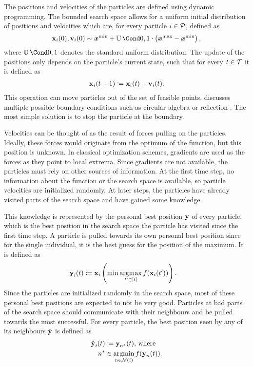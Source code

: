 The positions and velocities of the particles are defined using dynamic programming.
The bounded search space allows for a uniform initial distribution of positions and velocities which are, for every particle $i \in \operatorname{\mathcal{P}}$, defined as
\begin{align}
    \Pos_i(0), \Vel_i(0) \sim \mat{x^{\text{min}}} + \Uniform{0, 1} \cdot \left( \mat{x^{\text{max}}} - \mat{x^{\text{min}}} \right),
\end{align}
where $\Uniform{0, 1}$ denotes the standard uniform distribution.
The update of the positions only depends on the particle's current state, such that for every $t \in \mathcal{T}$ it is defined as
\begin{align}
    \operatorname{\mathbf{x}}_i(t+1) \coloneqq \operatorname{\mathbf{x}}_i(t) + \operatorname{\mathbf{v}}_i(t).
\end{align}
This operation can move particles out of the set of feasible points.
\citeauthor{engelbrecht_fundamentals_2006} discusses multiple possible boundary conditions such as circular algebra or reflection \cite{engelbrecht_fundamentals_2006}.
The most simple solution is to stop the particle at the boundary.

Velocities can be thought of as the result of forces pulling on the particles.
Ideally, these forces would originate from the optimum of the function, but this position is unknown.
In classical optimization schemes, gradients are used as the forces as they point to local extrema.
Since gradients are not available, the particles must rely on other sources of information.
At the first time step, no information about the function or the search space is available, so particle velocities are initialized randomly.
At later steps, the particles have already visited parts of the search space and have gained some knowledge.

This knowledge is represented by the personal best position $\operatorname{\mathbf{y}}$ of every particle, which is the best position in the search space the particle has visited since the first time step.
A particle is pulled towards its own personal best position since for the single individual, it is the best guess for the position of the maximum.
It is defined as
\begin{align}
    \operatorname{\mathbf{y}}_i(t) &\coloneqq \operatorname{\mathbf{x}}_i \left(\min\operatorname*{argmax}_{t^\prime \in [t]} f(\operatorname{\mathbf{x}}_i(t^\prime)) \right).
\end{align}
Since the particles are initialized randomly in the search space, most of these personal best positions are expected to not be very good.
Particles at bad parts of the search space should communicate with their neighbours and be pulled towards the most successful.
For every particle, the best position seen by any of its neighbours $\operatorname{\hat{\operatorname{\mathbf{y}}}}$ is defined as
\begin{align}
    \begin{split}
        \operatorname{\hat{\operatorname{\mathbf{y}}}}_i(t) &\coloneqq \operatorname{\mathbf{y}}_{n^\ast}(t) \text{, where} \\
        n^\ast &\in \operatorname*{argmin}_{n \in \operatorname{\mathcal{N}}(i)} f(\operatorname{\mathbf{y}}_n(t)).
    \end{split}
\end{align}

